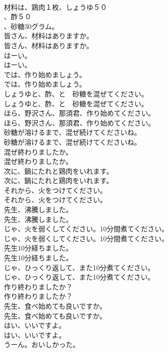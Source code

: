 \documentclass[8pt]{extreport}
\begin{document}
\begin{CJK}{UTF8}{min}
\\	材料は、鶏肉１枚、しょうゆ５０
\\	、酢５０
\\	、砂糖30グラム。 
\\	皆さん、材料はありますか。	
\\	皆さん、材料はありますか。 
\\	はーい。	
\\	はーい。 
\\	では、作り始めましょう。	
\\	では、作り始めましょう。 
\\	しょうゆと、酢、と　砂糖を混ぜてください。	
\\	しょうゆと、酢、と　砂糖を混ぜてください。 
\\	ほら、野沢さん、那須君、作り始めてください。	
\\	ほら、野沢さん、那須君、作り始めてください。 
\\	砂糖が溶けるまで、混ぜ続けてくださいね。	
\\	砂糖が溶けるまで、混ぜ続けてくださいね。 
\\	混ぜ終わりましたか。	
\\	混ぜ終わりましたか。 
\\	次に、鍋にたれと鶏肉をいれます。	
\\	次に、鍋にたれと鶏肉をいれます。 
\\	それから、火をつけてください。	
\\	それから、火をつけてください。 
\\	先生、沸騰しました。	
\\	先生、沸騰しました。 
\\	じゃ、火を弱くしてください。10分間煮てください。	
\\	じゃ、火を弱くしてください。10分間煮てください。 
\\	先生10分経ちました。	
\\	先生10分経ちました。 
\\	じゃ、ひっくり返して、また10分煮てください。	
\\	じゃ、ひっくり返して、また10分煮てください。 
\\	作り終わりましたか？	
\\	作り終わりましたか？ 
\\	先生、食べ始めても良いですか。	
\\	先生、食べ始めても良いですか。 
\\	はい、いいですよ。	
\\	はい、いいですよ。 
\\	うーん。おいしかった。	

\end{CJK}
\end{document}
